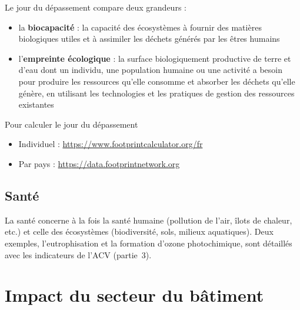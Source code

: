 Le jour du dépassement compare deux grandeurs :
\begin{itemize}
  \item la \textbf{biocapacité} : la capacité des écosystèmes à fournir des matières biologiques utiles et à assimiler les déchets générés par les êtres humains
  \item l'\textbf{empreinte écologique} : la surface biologiquement productive de terre et d'eau dont un individu, une population humaine ou une activité a besoin pour produire les ressources qu'elle consomme et absorber les déchets qu'elle génère, en utilisant les technologies et les pratiques de gestion des ressources existantes
\end{itemize}

\begin{encadre}{Pour calculer le jour du dépassement}
\begin{itemize}
  \item Individuel : \url{https://www.footprintcalculator.org/fr}
  \item Par pays : \url{https://data.footprintnetwork.org}
\end{itemize}
\end{encadre}


\section{Santé}

La santé concerne à la fois la santé humaine (pollution de l'air, îlots de chaleur, etc.) et celle des écosystèmes (biodiversité, sols, milieux aquatiques). Deux exemples, l'eutrophisation et la formation d'ozone photochimique, sont détaillés avec les indicateurs de l'ACV (partie~3).

\chapter{Impact du secteur du bâtiment}


